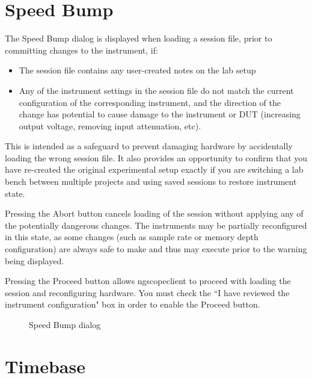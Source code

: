 
\section{Speed Bump}
\label{dlg:speedbump}

The Speed Bump dialog is displayed when loading a session file, prior to committing changes to the instrument, if:

\begin{itemize}
\item The session file contains any user-created notes on the lab setup
\item Any of the instrument settings in the session file do not match the current configuration of the corresponding
instrument, and the direction of the change has potential to cause damage to the instrument or DUT (increasing output
voltage, removing input attenuation, etc).
\end{itemize}

This is intended as a safeguard to prevent damaging hardware by accidentally loading the wrong session file. It also
provides an opportunity to confirm that you have re-created the original experimental setup exactly if you are
switching a lab bench between multiple projects and using saved sessions to restore instrument state.

Pressing the Abort button cancels loading of the session without applying any of the potentially dangerous changes.
The instruments may be partially reconfigured in this state, as some changes (such as sample rate or memory depth
configuration) are always safe to make and thus may execute prior to the warning being displayed.

Pressing the Proceed button allows ngscopeclient to proceed with loading the session and reconfiguring hardware. You
must check the ``I have reviewed the instrument configuration" box in order to enable the Proceed button.

\begin{figure}[H]
\centering
{}
\caption{Speed Bump dialog}
\label{speedbump}
\end{figure}


\section{Timebase}
\label{dlg:timebase}


